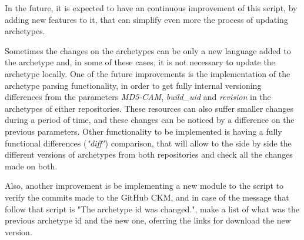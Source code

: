 \documentclass[mim_thesis.tex]{subfiles}
\begin{document}
In the future, it is expected to have an continuous improvement of this script, by adding new features to it, that can simplify even more the process of updating archetypes. 

Sometimes the changes on the archetypes can be only a new language added to the archetype and, in some of these cases, it is not necessary to update the archetype locally. One of the future improvements is the implementation of the archetype parsing functionality, in order to get fully internal versioning differences from the parameters \textit{MD5-CAM}, \textit{build\_uid} and \textit{revision} in the archetypes of either repositories. These resources can also suffer smaller changes during a period of time, and these changes can be noticed by a difference on the previous parameters. Other functionality to be implemented is having a fully functional differences (\textit{"diff"}) comparison, that will allow to the side by side the different versions of archetypes from both repositories and check all the changes made on both. 

Also, another improvement is be implementing a new module to the script to verify the commits made to the GitHub CKM, and in case of the message that follow that script is "The archetype id was changed.", make a list of what was the previous archetype id and the new one, oferring the links for download the new version.
\end{document}

